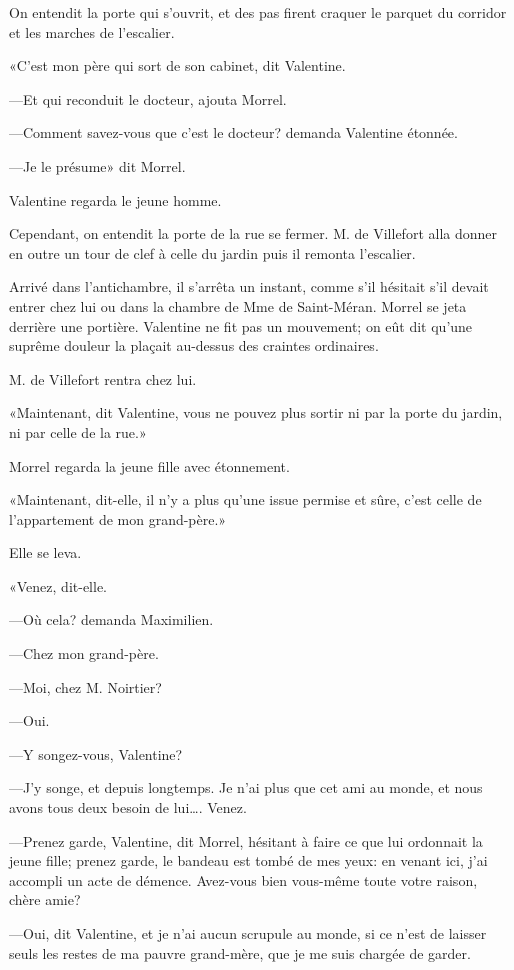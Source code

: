 On entendit la porte qui s'ouvrit, et des pas firent craquer le parquet du corridor et les marches de l'escalier. 

«C'est mon père qui sort de son cabinet, dit Valentine. 

—Et qui reconduit le docteur, ajouta Morrel. 

—Comment savez-vous que c'est le docteur? demanda Valentine étonnée. 

—Je le présume» dit Morrel. 

Valentine regarda le jeune homme. 

Cependant, on entendit la porte de la rue se fermer. M. de Villefort alla donner en outre un tour de clef à celle du jardin puis il remonta l'escalier. 

Arrivé dans l'antichambre, il s'arrêta un instant, comme s'il hésitait s'il devait entrer chez lui ou dans la chambre de Mme de Saint-Méran. Morrel se jeta derrière une portière. Valentine ne fit pas un mouvement; on eût dit qu'une suprême douleur la plaçait au-dessus des craintes ordinaires. 

M. de Villefort rentra chez lui. 

«Maintenant, dit Valentine, vous ne pouvez plus sortir ni par la porte du jardin, ni par celle de la rue.» 

Morrel regarda la jeune fille avec étonnement. 

«Maintenant, dit-elle, il n'y a plus qu'une issue permise et sûre, c'est celle de l'appartement de mon grand-père.» 

Elle se leva. 

«Venez, dit-elle. 

—Où cela? demanda Maximilien. 

—Chez mon grand-père. 

—Moi, chez M. Noirtier? 

—Oui. 

—Y songez-vous, Valentine? 

—J'y songe, et depuis longtemps. Je n'ai plus que cet ami au monde, et nous avons tous deux besoin de lui\dots. Venez. 

—Prenez garde, Valentine, dit Morrel, hésitant à faire ce que lui ordonnait la jeune fille; prenez garde, le bandeau est tombé de mes yeux: en venant ici, j'ai accompli un acte de démence. Avez-vous bien vous-même toute votre raison, chère amie? 

—Oui, dit Valentine, et je n'ai aucun scrupule au monde, si ce n'est de laisser seuls les restes de ma pauvre grand-mère, que je me suis chargée de garder. 

